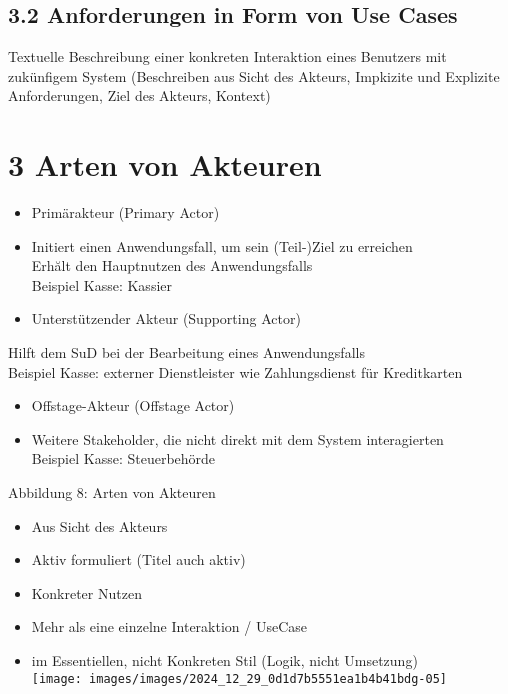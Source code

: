 \subsection*{3.2 Anforderungen in Form von Use Cases}
Textuelle Beschreibung einer konkreten Interaktion eines Benutzers mit zukünfigem System (Beschreiben aus Sicht des Akteurs, Impkizite und Explizite Anforderungen, Ziel des Akteurs, Kontext)

\section*{3 Arten von Akteuren}
\begin{itemize}
  \item Primärakteur (Primary Actor)
  \item Initiert einen Anwendungsfall, um sein (Teil-)Ziel zu erreichen\\
Erhălt den Hauptnutzen des Anwendungsfalls\\
Beispiel Kasse: Kassier
  \item Unterstützender Akteur (Supporting Actor)
\end{itemize}

Hilft dem SuD bei der Bearbeitung eines Anwendungsfalls\\
Beispiel Kasse: externer Dienstleister wie Zahlungsdienst für Kreditkarten

\begin{itemize}
  \item Offstage-Akteur (Offstage Actor)
  \item Weitere Stakeholder, die nicht direkt mit dem System interagierten\\
Beispiel Kasse: Steuerbehörde
\end{itemize}

Abbildung 8: Arten von Akteuren

\begin{itemize}
  \item Aus Sicht des Akteurs
  \item Aktiv formuliert (Titel auch aktiv)
  \item Konkreter Nutzen
  \item Mehr als eine einzelne Interaktion / UseCase
  \item im Essentiellen, nicht Konkreten Stil (Logik, nicht Umsetzung)\\
\texttt{[image: images/images/2024\_12\_29\_0d1d7b5551ea1b4b41bdg-05]}
\end{itemize}

